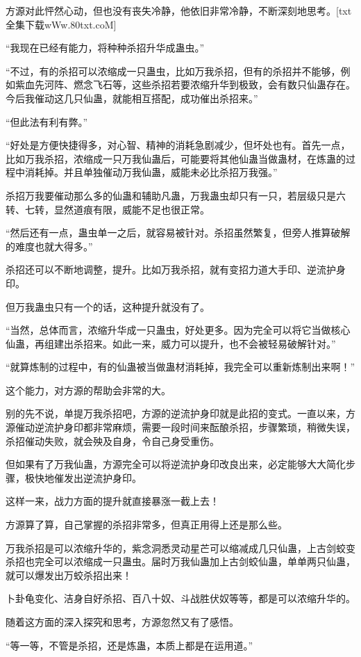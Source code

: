 \begin{this_body}
方源对此怦然心动，但也没有丧失冷静，他依旧非常冷静，不断深刻地思考。[txt全集下载wWw.80txt.coM]

“我现在已经有能力，将种种杀招升华成蛊虫。”

“不过，有的杀招可以浓缩成一只蛊虫，比如万我杀招，但有的杀招并不能够，例如紫血先河阵、燃念飞石等，这些杀招若要浓缩升华到极致，会有数只仙蛊存在。今后我催动这几只仙蛊，就能相互搭配，成功催出杀招来。”

“但此法有利有弊。”

“好处是方便快捷得多，对心智、精神的消耗急剧减少，但坏处也有。首先一点，比如万我杀招，浓缩成一只万我仙蛊后，可能要将其他仙蛊当做蛊材，在炼蛊的过程中消耗掉。并且单独催动万我仙蛊，威能未必比杀招万我强。”

杀招万我要催动那么多的仙蛊和辅助凡蛊，万我蛊虫却只有一只，若层级只是六转、七转，显然道痕有限，威能不足也很正常。

“然后还有一点，蛊虫单一之后，就容易被针对。杀招虽然繁复，但旁人推算破解的难度也就大得多。”

杀招还可以不断地调整，提升。比如万我杀招，就有变招力道大手印、逆流护身印。

但万我蛊虫只有一个的话，这种提升就没有了。

“当然，总体而言，浓缩升华成一只蛊虫，好处更多。因为完全可以将它当做核心仙蛊，再组建出杀招来。如此一来，威力可以提升，也不会被轻易破解针对。”

“就算炼制的过程中，有的仙蛊被当做蛊材消耗掉，我完全可以重新炼制出来啊！”

这个能力，对方源的帮助会非常的大。

别的先不说，单提万我杀招吧，方源的逆流护身印就是此招的变式。一直以来，方源催动逆流护身印都非常麻烦，需要一段时间来酝酿杀招，步骤繁琐，稍微失误，杀招催动失败，就会殃及自身，令自己身受重伤。

但如果有了万我仙蛊，方源完全可以将逆流护身印改良出来，必定能够大大简化步骤，极快地催发出逆流护身印。

这样一来，战力方面的提升就直接暴涨一截上去！

方源算了算，自己掌握的杀招非常多，但真正用得上还是那么些。

万我杀招是可以浓缩升华的，紫念洞悉灵动星芒可以缩减成几只仙蛊，上古剑蛟变杀招也完全可以浓缩成一只蛊虫。届时万我仙蛊加上古剑蛟仙蛊，单单两只仙蛊，就可以爆发出万蛟杀招出来！

卜卦龟变化、洁身自好杀招、百八十奴、斗战胜伏奴等等，都是可以浓缩升华的。

随着这方面的深入探究和思考，方源忽然又有了感悟。

“等一等，不管是杀招，还是炼蛊，本质上都是在运用道。”


\end{this_body}

